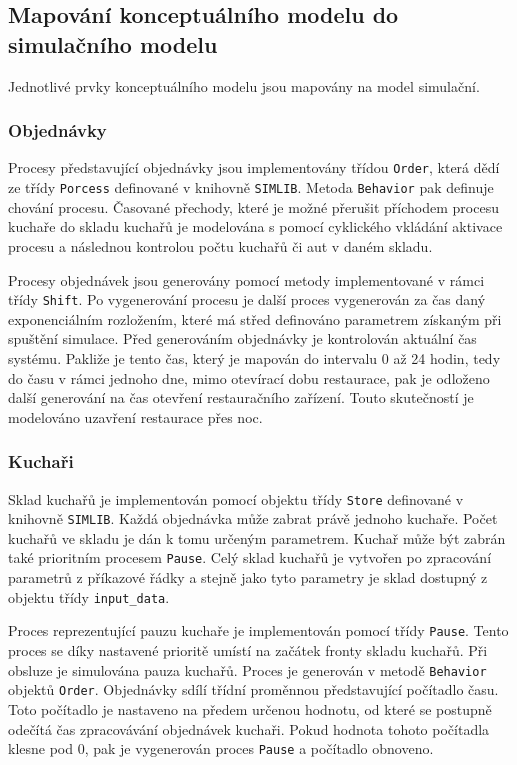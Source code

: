 \documentclass[a4paper, 11pt]{article}
\begin{document}
\subsection{Mapování konceptuálního modelu do simulačního modelu}
Jednotlivé prvky konceptuálního modelu jsou mapovány na model simulační.
 
 \subsubsection{Objednávky}
Procesy představující objednávky jsou implementovány třídou \texttt{Order}, která dědí ze třídy \texttt{Porcess} definované v knihovně \texttt{SIMLIB}. Metoda \texttt{Behavior} pak definuje chování procesu. Časované přechody, které je možné přerušit příchodem procesu kuchaře do skladu kuchařů je modelována s pomocí cyklického vkládání aktivace procesu a následnou kontrolou počtu kuchařů či aut v daném skladu. 

Procesy objednávek jsou generovány pomocí metody implementované v rámci třídy \texttt{Shift}. Po vygenerování procesu je další proces vygenerován za čas daný exponenciálním rozložením, které má střed definováno parametrem získaným při spuštění simulace. Před generováním objednávky je kontrolován aktuální čas systému. Pakliže je tento čas, který je mapován do intervalu 0 až 24 hodin, tedy do času v rámci jednoho dne, mimo otevírací dobu restaurace, pak je odloženo další generování na čas otevření restauračního zařízení. Touto skutečností je modelováno uzavření restaurace přes noc. 

\subsubsection{Kuchaři}
Sklad kuchařů je implementován pomocí objektu třídy \texttt{Store} definované v knihovně \texttt{SIMLIB}. Každá objednávka může zabrat právě jednoho kuchaře. Počet kuchařů ve skladu je dán k tomu určeným parametrem. Kuchař může být zabrán také prioritním procesem \texttt{Pause}. Celý sklad kuchařů je vytvořen po zpracování parametrů z příkazové řádky a stejně jako tyto parametry je sklad dostupný z objektu třídy \texttt{input\_data}.

Proces reprezentující pauzu kuchaře je implementován pomocí třídy \texttt{Pause}. Tento proces se díky nastavené prioritě umístí na začátek fronty skladu kuchařů. Při obsluze je simulována pauza kuchařů. Proces je generován v metodě \texttt{Behavior} objektů \texttt{Order}. Objednávky sdílí třídní proměnnou představující počítadlo času. Toto počítadlo je nastaveno na předem určenou hodnotu, od které se postupně odečítá čas zpracovávání objednávek kuchaři. Pokud hodnota tohoto počítadla klesne pod 0, pak je vygenerován proces \texttt{Pause} a počítadlo obnoveno.
\end{document}
